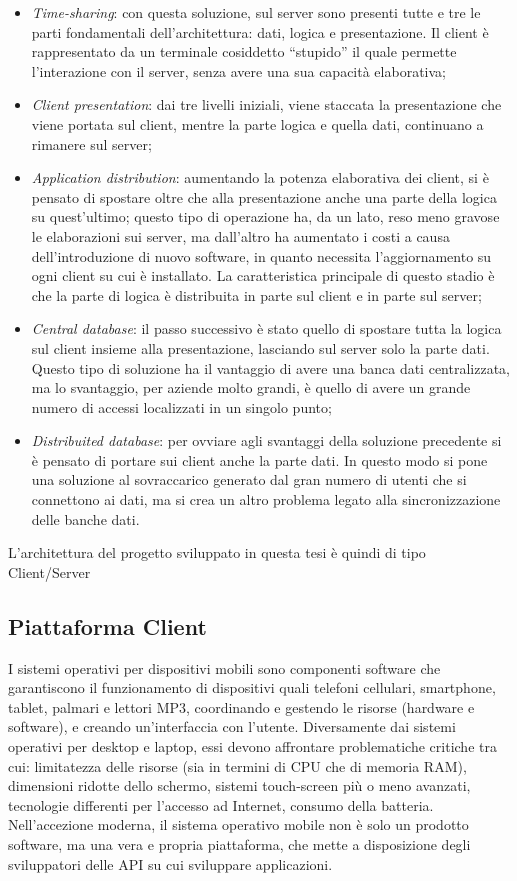 \begin{itemize}
\item \emph{Time-sharing}: con questa soluzione, sul server sono presenti tutte e tre le parti fondamentali dell'architettura: dati, logica e presentazione. Il client è rappresentato da un terminale cosiddetto “stupido” il quale permette l'interazione con il server, senza avere una sua capacità elaborativa;
\item \emph{Client presentation}: dai tre livelli iniziali, viene staccata la presentazione che viene portata sul client, mentre la parte logica e quella dati, continuano a rimanere sul server;
\item \emph{Application distribution}: aumentando la potenza elaborativa dei client, si è pensato di spostare oltre che alla presentazione anche una parte della logica su quest'ultimo; questo tipo di operazione ha, da un lato, reso meno gravose le elaborazioni sui server, ma dall'altro ha aumentato i costi a causa dell'introduzione di nuovo software, in quanto necessita l'aggiornamento su ogni client su cui è installato. La caratteristica principale di questo stadio è che la parte di logica è distribuita in parte sul client e in parte sul server;
\item \emph{Central database}: il passo successivo è stato quello di spostare tutta la logica sul client insieme alla presentazione, lasciando sul server solo la parte dati. Questo tipo di soluzione ha il vantaggio di avere una banca dati centralizzata, ma lo svantaggio, per aziende molto grandi, è quello di avere un grande numero di accessi localizzati in un singolo punto;
\item \emph{Distribuited database}: per ovviare agli svantaggi della soluzione precedente si è pensato di portare sui client anche la parte dati. In questo modo si pone una soluzione al sovraccarico generato dal gran numero di utenti che si connettono ai dati, ma si crea un
altro problema legato alla sincronizzazione delle banche dati.
\end{itemize}

L'architettura del progetto sviluppato in questa tesi è quindi di tipo Client/Server



\subsection{Piattaforma Client}

I sistemi operativi per dispositivi mobili sono componenti software che garantiscono il funzionamento di dispositivi quali telefoni cellulari, smartphone, tablet, palmari e lettori MP3, coordinando e gestendo le risorse (hardware e software), e creando un'interfaccia con l'utente.
Diversamente dai sistemi operativi per desktop e laptop, essi devono affrontare problematiche critiche tra cui: limitatezza delle risorse (sia in termini di CPU che di memoria RAM), dimensioni ridotte dello schermo, sistemi touch-screen più o meno avanzati, tecnologie differenti per l'accesso ad Internet, consumo della batteria.
Nell'accezione moderna, il sistema operativo mobile non è solo un prodotto software, ma una vera e propria piattaforma, che mette a disposizione degli sviluppatori delle API su cui sviluppare applicazioni.

